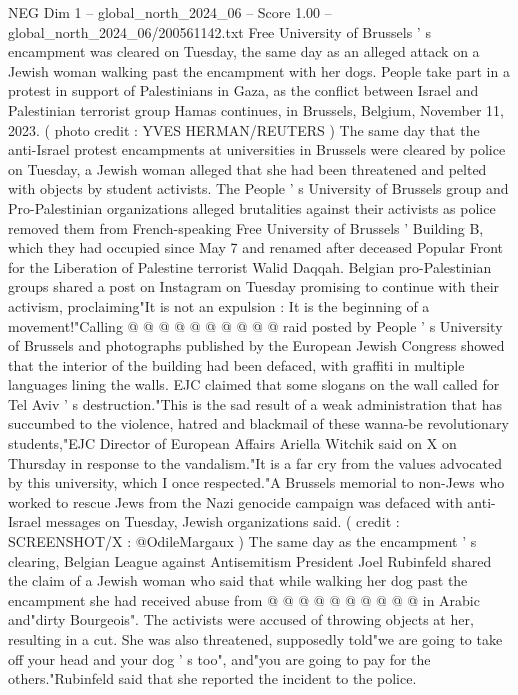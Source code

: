 \begin{textsample}{NEG Dim 1 – global\_north\_2024\_06 – Score 1.00 – global\_north\_2024\_06/200561142.txt}  \label{ex:f1_neg_213}
Free University of Brussels ' s encampment was cleared on Tuesday, the same day as an alleged attack on a Jewish woman walking past the encampment with her dogs.
People take part in a protest in support of Palestinians in Gaza, as the conflict between Israel and Palestinian terrorist group Hamas continues, in Brussels, Belgium, November 11, 2023. ( photo credit : YVES HERMAN/REUTERS ) The same day that the anti-Israel protest encampments at universities in Brussels were cleared by police on Tuesday, a Jewish woman alleged that she had been threatened and pelted with objects by student activists.
The People ' s University of Brussels group and Pro-Palestinian organizations alleged brutalities against their activists as police removed them from French-speaking Free University of Brussels ' Building B, which they had occupied since May 7 and renamed after deceased Popular Front for the Liberation of Palestine terrorist Walid Daqqah.
Belgian pro-Palestinian groups shared a post on Instagram on Tuesday promising to continue with their activism, proclaiming"It is not an expulsion : It is the beginning of a movement!"Calling @ @ @ @ @ @ @ @ @ @ raid posted by People ' s University of Brussels and photographs published by the European Jewish Congress showed that the interior of the building had been defaced, with graffiti in multiple languages lining the walls.
EJC claimed that some slogans on the wall called for Tel Aviv ' s destruction."This is the sad result of a weak administration that has succumbed to the violence, hatred and blackmail of these wanna-be revolutionary students,"EJC Director of European Affairs Ariella Witchik said on X on Thursday in response to the vandalism."It is a far cry from the values advocated by this university, which I once respected."A Brussels memorial to non-Jews who worked to rescue Jews from the Nazi genocide campaign was defaced with anti-Israel messages on Tuesday, Jewish organizations said. ( credit : SCREENSHOT/X : @OdileMargaux ) The same day as the encampment ' s clearing, Belgian League against Antisemitism President Joel Rubinfeld shared the claim of a Jewish woman who said that while walking her dog past the encampment she had received abuse from @ @ @ @ @ @ @ @ @ @ in Arabic and"dirty Bourgeois".
The activists were accused of throwing objects at her, resulting in a cut.
She was also threatened, supposedly told"we are going to take off your head and your dog ' s too", and"you are going to pay for the others."Rubinfeld said that she reported the incident to the police.

\end{textsample}
